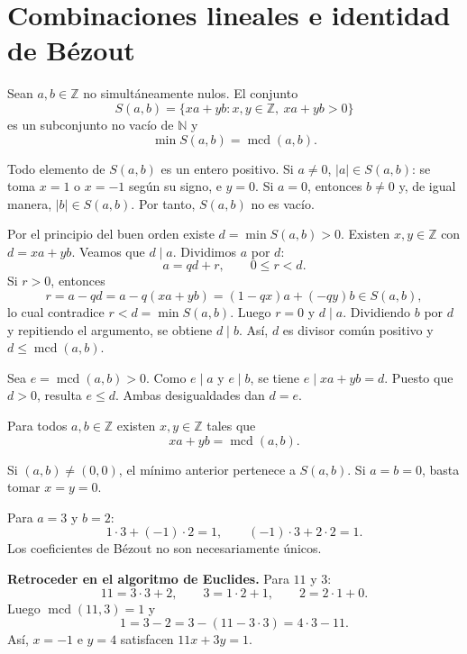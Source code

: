 \section{Combinaciones lineales e identidad de Bézout}
\begin{proposicion}
Sean $a,b\in\mathbb Z$ no simultáneamente nulos. El conjunto
\[
S(a,b)=\{xa+yb:x,y\in\mathbb Z,\ xa+yb>0\}
\]
es un subconjunto no vacío de $\mathbb N$ y
\[
\min S(a,b)=\operatorname{mcd}(a,b).
\]
\end{proposicion}
\begin{demostracion}
Todo elemento de $S(a,b)$ es un entero positivo. Si $a\neq0$, $|a|\in S(a,b)$: se toma $x=1$ o $x=-1$ según su signo, e $y=0$. Si $a=0$, entonces $b\neq0$ y, de igual manera, $|b|\in S(a,b)$. Por tanto, $S(a,b)$ no es vacío.

Por el principio del buen orden existe $d=\min S(a,b)>0$. Existen $x,y\in\mathbb Z$ con $d=xa+yb$. Veamos que $d\mid a$. Dividimos $a$ por $d$:
\[
a=qd+r,\qquad 0\leq r<d.
\]
Si $r>0$, entonces
\[
r=a-qd=a-q(xa+yb)=(1-qx)a+(-qy)b\in S(a,b),
\]
lo cual contradice $r<d=\min S(a,b)$. Luego $r=0$ y $d\mid a$. Dividiendo $b$ por $d$ y repitiendo el argumento, se obtiene $d\mid b$. Así, $d$ es divisor común positivo y $d\leq\operatorname{mcd}(a,b)$.

Sea $e=\operatorname{mcd}(a,b)>0$. Como $e\mid a$ y $e\mid b$, se tiene $e\mid xa+yb=d$. Puesto que $d>0$, resulta $e\leq d$. Ambas desigualdades dan $d=e$.
\end{demostracion}
\begin{proposicion}[{title={Identidad de Bézout}}]
Para todos $a,b\in\mathbb Z$ existen $x,y\in\mathbb Z$ tales que
\[
xa+yb=\operatorname{mcd}(a,b).
\]
\end{proposicion}
\begin{demostracion}
Si $(a,b)\neq(0,0)$, el mínimo anterior pertenece a $S(a,b)$. Si $a=b=0$, basta tomar $x=y=0$.
\end{demostracion}
\begin{ejemplo}
Para $a=3$ y $b=2$:
\[
1\cdot3+(-1)\cdot2=1,\qquad (-1)\cdot3+2\cdot2=1.
\]
Los coeficientes de Bézout no son necesariamente únicos.
\end{ejemplo}
\begin{ejemplo}
\textbf{Retroceder en el algoritmo de Euclides.} Para $11$ y $3$:
\[
11=3\cdot3+2,\qquad3=1\cdot2+1,\qquad2=2\cdot1+0.
\]
Luego $\operatorname{mcd}(11,3)=1$ y
\[
1=3-2=3-(11-3\cdot3)=4\cdot3-11.
\]
Así, $x=-1$ e $y=4$ satisfacen $11x+3y=1$.
\end{ejemplo}

